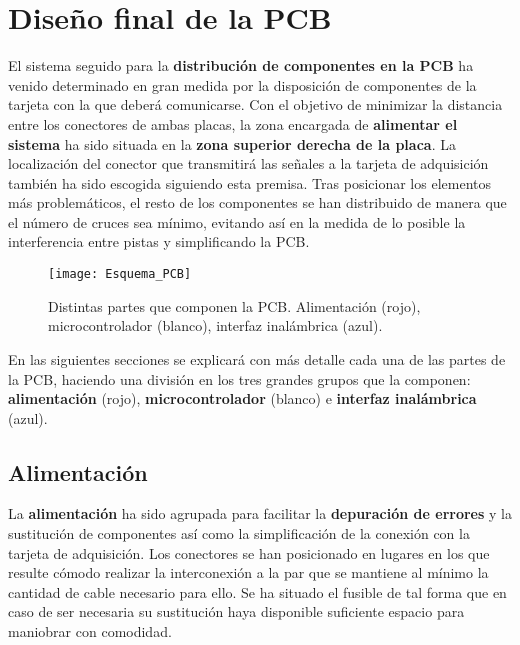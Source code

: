 \clearpage 
 
\section{Diseño final de la PCB\label{sec:PCB_final}}

El sistema seguido para la \textbf{distribución de componentes en la \acrshort{PCB}} ha venido determinado en gran medida por la disposición de componentes de la tarjeta con la que deberá comunicarse. Con el objetivo de minimizar la distancia entre los conectores de ambas placas, la zona encargada de \textbf{alimentar el sistema} ha sido situada en la \textbf{zona superior derecha de la placa}. La localización del conector que transmitirá las señales a la tarjeta de adquisición también ha sido escogida siguiendo esta premisa. Tras posicionar los elementos más problemáticos, el resto de los componentes se han distribuido de manera que el número de cruces sea mínimo, evitando así en la medida de lo posible la interferencia entre pistas y simplificando la \acrshort{PCB}.

\begin{figure} [H]
    \centering
    \texttt{[image: Esquema\_PCB]}
    \caption{Distintas partes que componen la PCB. Alimentación (rojo), microcontrolador (blanco), interfaz inalámbrica (azul).}
    \label{fig:Esquema_PCB}
\end{figure}

En las siguientes secciones se explicará con más detalle cada una de las partes de la \acrshort{PCB}, haciendo una división en los tres grandes grupos que la componen: \textbf{alimentación} (rojo), \textbf{microcontrolador} (blanco) e \textbf{interfaz inalámbrica} (azul).

\clearpage

\subsection{Alimentación\label{sec:PCB_alimentacion}}

La \textbf{alimentación} ha sido agrupada para facilitar la \textbf{depuración de errores} y la sustitución de componentes así como la simplificación de la conexión con la tarjeta de adquisición. Los conectores se han posicionado en lugares en los que resulte cómodo realizar la interconexión a la par que se mantiene al mínimo la cantidad de cable necesario para ello. Se ha situado el fusible de tal forma que en caso de ser necesaria su sustitución haya disponible suficiente espacio para maniobrar con comodidad.

